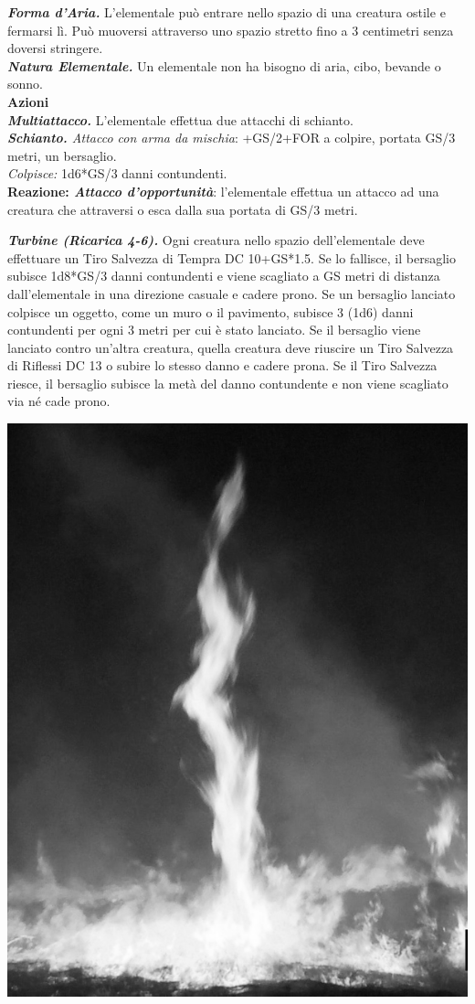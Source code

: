 \begin{multicols}{2}
{\emph{\textbf{Forma d'Aria.}} L'elementale può entrare nello spazio di una creatura ostile e fermarsi lì. Può muoversi attraverso uno spazio stretto fino a 3 centimetri senza doversi stringere.\\
\emph{\textbf{Natura Elementale.}} Un elementale non ha bisogno di aria, cibo, bevande o sonno.\\
\textbf{Azioni}\\
\emph{\textbf{Multiattacco.}} L'elementale effettua due attacchi di schianto.\\
\emph{\textbf{Schianto.} Attacco con arma da mischia}: +GS/2+FOR a colpire, portata GS/3 metri, un bersaglio.\\
\emph{Colpisce:} 1d6*GS/3 danni contundenti.\\

\textbf{Reazione: \emph{Attacco d'opportunità}}: l'elementale effettua un attacco ad una creatura che attraversi o esca dalla sua portata di GS/3 metri.

\emph{\textbf{Turbine (Ricarica 4-6).}} Ogni creatura nello spazio dell'elementale deve effettuare un Tiro Salvezza di Tempra DC 10+GS*1.5. Se lo fallisce, il bersaglio subisce 1d8*GS/3 danni contundenti e viene scagliato a GS metri di distanza dall'elementale in una direzione casuale e cadere prono. Se un bersaglio lanciato colpisce un oggetto, come un muro o il pavimento, subisce 3 (1d6) danni contundenti per ogni 3 metri per cui è stato lanciato. Se il bersaglio viene lanciato contro un'altra creatura, quella creatura deve riuscire un Tiro Salvezza di Riflessi DC 13 o subire lo stesso danno e cadere prona.
Se il Tiro Salvezza riesce, il bersaglio subisce la metà del danno contundente e non viene scagliato via né cade prono.

\begin{center}
\includegraphics[width=0.7\linewidth]{immagini/wildfire_grayscale.png}
\end{center}

}
\end{multicols}
